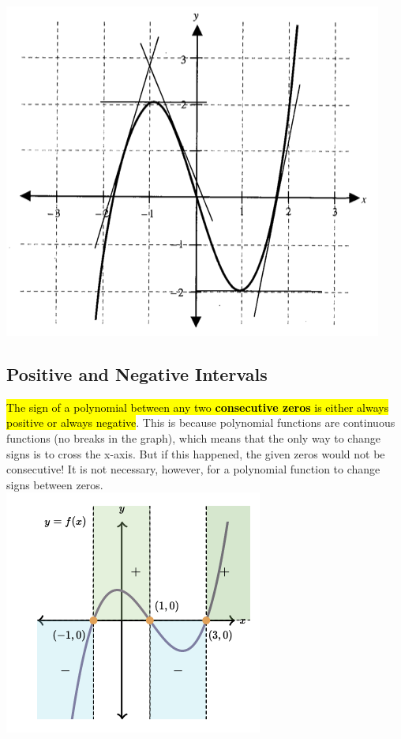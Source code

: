 \documentclass{book}
\begin{document}
	\includegraphics[scale=0.7]{turningpoint}
	
	\subsection{Positive and Negative Intervals}
	\hl{The sign of a polynomial between any two \textbf{consecutive zeros} is either always positive or always negative}. This is because polynomial functions are continuous functions (no breaks in the graph), which means that the only way to change signs is to cross the x-axis. But if this happened, the given zeros would not be consecutive! It is not necessary, however, for a polynomial function to change signs between zeros.
	\\
	
	\includegraphics[scale=0.5]{pinterval1}
	
\end{document}
